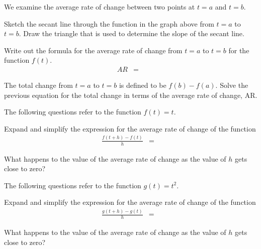 \begin{problem}
\item We examine the average rate of change between two points at
  $t=a$ and $t=b$.

  \scalebox{0.7}{}

  \begin{subproblem}
  \item Sketch the secant line through the function in the graph above
    from $t=a$ to $t=b$. Draw the triangle that is used to determine
    the slope of the secant line.
  \item Write out the formula for the average rate of change from
    $t=a$ to $t=b$ for the function $f(t)$. 
    \begin{eqnarray*}
      AR & = & 
    \end{eqnarray*}
  \item The total change from $t=a$ to $t=b$ is defined to be
    $f(b)-f(a)$. Solve the previous equation for the total change in
    terms of the average rate of change, AR.
    \vspace{3em}
  \end{subproblem}

  \clearpage

  \item The following questions refer to the function $f(t)=t$.
    \begin{subproblem}
    \item Expand and simplify the expression for the average rate of
      change of the function
      \begin{eqnarray*}
        \frac{f(t+h)-f(t)}{h} & = & 
      \end{eqnarray*}
      \vspace{3em}
    \item What happens to the value of the average rate of change as
      the value of $h$ gets close to zero?
      \vspace{3em}
    \end{subproblem}

  \item The following questions refer to the function $g(t)=t^2$.
    \begin{subproblem}
    \item Expand and simplify the expression for the average rate of
      change of the function
      \begin{eqnarray*}
        \frac{g(t+h)-g(t)}{h} & = & 
      \end{eqnarray*}
      \vspace{3em}
    \item What happens to the value of the average rate of change as
      the value of $h$ gets close to zero?
      \vspace{3em}
    \end{subproblem}


\end{problem}
